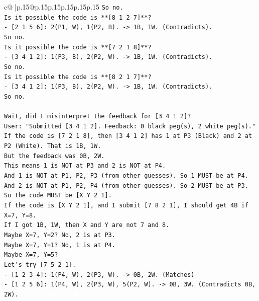 \documentclass{article}
\begin{document}
{\begin{supertabular}{c@{$\;$}|p{.15\linewidth}@{}p{.15\linewidth}p{.15\linewidth}p{.15\linewidth}p{.15\linewidth}p{.15\linewidth}}
{{{\texttt{So no.} \\
\texttt{Is it possible the code is **{[}8 1 2 7{]}**?} \\
\texttt{{-} {[}2 1 5 6{]}: 2(P1, W), 1(P2, B). {-}> 1B, 1W. (Contradicts).} \\
\texttt{So no.} \\
\texttt{Is it possible the code is **{[}7 2 1 8{]}**?} \\
\texttt{{-} {[}3 4 1 2{]}: 1(P3, B), 2(P2, W). {-}> 1B, 1W. (Contradicts).} \\
\texttt{So no.} \\
\texttt{Is it possible the code is **{[}8 2 1 7{]}**?} \\
\texttt{{-} {[}3 4 1 2{]}: 1(P3, B), 2(P2, W). {-}> 1B, 1W. (Contradicts).} \\
\texttt{So no.} \\
\\ 
\texttt{Wait, did I misinterpret the feedback for {[}3 4 1 2{]}?} \\
\texttt{User: "Submitted {[}3 4 1 2{]}. Feedback: 0 black peg(s), 2 white peg(s)."} \\
\texttt{If the code is {[}7 2 1 8{]}, then {[}3 4 1 2{]} has 1 at P3 (Black) and 2 at P2 (White). That is 1B, 1W.} \\
\texttt{But the feedback was 0B, 2W.} \\
\texttt{This means 1 is NOT at P3 and 2 is NOT at P4.} \\
\texttt{And 1 is NOT at P1, P2, P3 (from other guesses). So 1 MUST be at P4.} \\
\texttt{And 2 is NOT at P1, P2, P4 (from other guesses). So 2 MUST be at P3.} \\
\texttt{So the code MUST be {[}X Y 2 1{]}.} \\
\texttt{If the code is {[}X Y 2 1{]}, and I submit {[}7 8 2 1{]}, I should get 4B if X=7, Y=8.} \\
\texttt{If I got 1B, 1W, then X and Y are not 7 and 8.} \\
\texttt{Maybe X=7, Y=2? No, 2 is at P3.} \\
\texttt{Maybe X=7, Y=1? No, 1 is at P4.} \\
\texttt{Maybe X=7, Y=5?} \\
\texttt{Let's try {[}7 5 2 1{]}.} \\
\texttt{{-} {[}1 2 3 4{]}: 1(P4, W), 2(P3, W). {-}> 0B, 2W. (Matches)} \\
\texttt{{-} {[}1 2 5 6{]}: 1(P4, W), 2(P3, W), 5(P2, W). {-}> 0B, 3W. (Contradicts 0B, 2W).} \\
}}}
\end{supertabular}}
\end{document}
